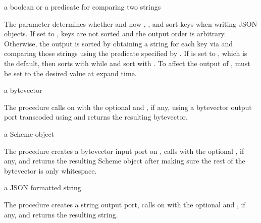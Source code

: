 \begin{parameter}
\end{parameter}
\returns{} a boolean or a predicate for comparing two strings

The  parameter determines whether and how
, , and  sort keys
when writing JSON objects.
If set to , keys are not sorted and the output order is arbitrary.
Otherwise, the output is sorted by obtaining a string for each key
via  and comparing those strings using the predicate
specified by .
If  is set to , which is the default,
then  sorts with 
while  and  sort with
.
To affect the output of ,  must
be set to the desired value at expand time.

\begin{procedure}
\end{procedure}
\returns{} a bytevector

The  procedure calls 
on  with the optional  and , if
any, using a bytevector output port transcoded using
 and returns the resulting bytevector.

\begin{procedure}
\end{procedure}
\returns{} a Scheme object

The  procedure creates a bytevector input port
on , calls  with the optional ,
if any, and returns the resulting Scheme object after making sure the rest
of the bytevector is only whitespace.

\begin{procedure}
\end{procedure}
\returns{} a JSON formatted string

The  procedure creates a string output port,
calls  on  with the optional  and
, if any, and returns the resulting string.

